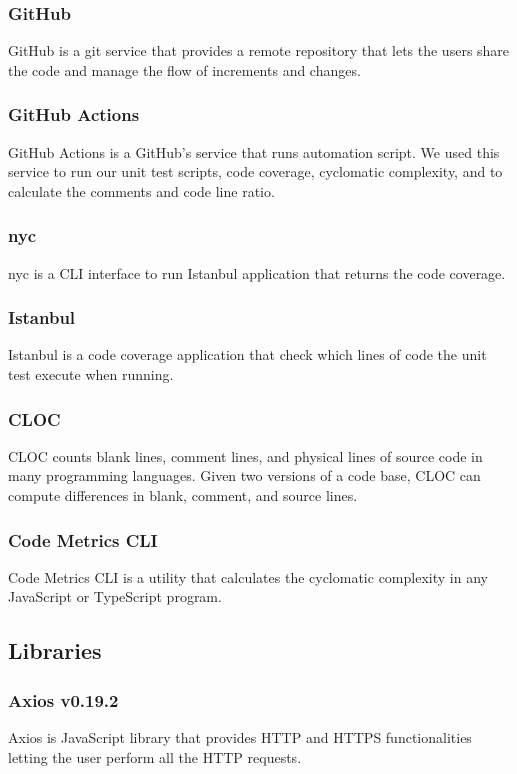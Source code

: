 \subsubsection*{GitHub}
GitHub is a git service that provides a remote repository that lets the users share the code and manage the flow of increments and changes.

\subsubsection*{GitHub Actions}
GitHub Actions is a GitHub's service that runs automation script.
We used this service to run our unit test scripts, code coverage, cyclomatic complexity, and to calculate the comments and code line ratio.

\subsubsection*{nyc}
nyc is a CLI interface to run Istanbul application that returns the code coverage.

\subsubsection*{Istanbul}
Istanbul is a code coverage application that check which lines of code the unit test execute when running.

\subsubsection*{CLOC}
CLOC counts blank lines, comment lines, and physical lines of source code in many programming languages. Given two versions of a code base, CLOC can compute differences in blank, comment, and source lines.

\subsubsection*{Code Metrics CLI}
Code Metrics CLI is a utility that calculates the cyclomatic complexity in any JavaScript or TypeScript program.


\subsection{Libraries}

\subsubsection*{Axios v0.19.2}
Axios is JavaScript library that provides HTTP and HTTPS functionalities letting the user perform all the HTTP requests.

